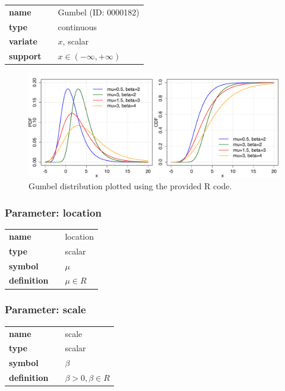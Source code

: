 \documentclass{article}
\begin{document}
  \bigskip 

\begin{tabular}{p{2cm}cl}
\textbf{name} & & Gumbel (ID: 0000182)\\ 
 
\textbf{type} & & continuous \\ 

\textbf{variate} & & $x$, scalar \\ 

\textbf{support} & & $x \in (-\infty,+\infty)$
\end{tabular}

\begin{figure}[ht!]
\centering
  \includegraphics[width=140mm]{pics/Gumbel.pdf}
 \caption{Gumbel distribution plotted using the provided R code.}
 \label{fig:Gumbel}
\end{figure}

\subsubsection*{Parameter: location}

\noindent\begin{tabular}{p{2cm}cl}
\textbf{name} & & location \\
\textbf{type} & & scalar \\
\textbf{symbol} & & $\mu$  \\
\textbf{definition} & & $\mu \in  R$
\end{tabular}
\subsubsection*{Parameter: scale}

\noindent\begin{tabular}{p{2cm}cl}
\textbf{name} & & scale \\
\textbf{type} & & scalar \\
\textbf{symbol} & & $\beta$  \\
\textbf{definition} & & $\beta>0, \beta \in  R$
\end{tabular}
\end{document}
